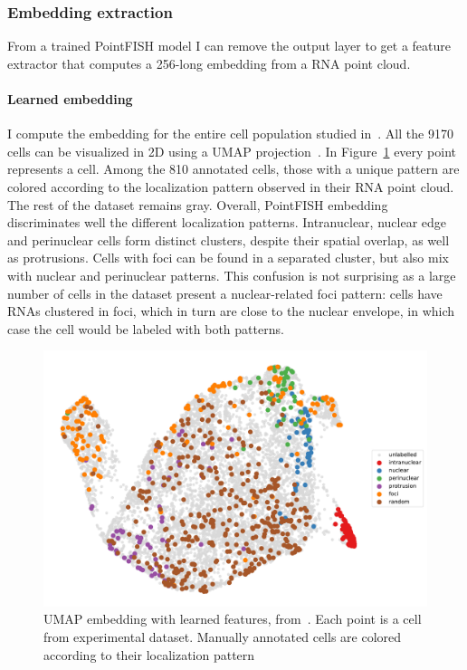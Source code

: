 \subsubsection{Embedding extraction}

From a trained PointFISH model I can remove the output layer to get a feature extractor that computes a 256-long embedding from a \ac{RNA} point cloud.

\paragraph{Learned embedding}

I compute the embedding for the entire cell population studied in~\cite{CHOUAIB_2020}.
All the 9170 cells can be visualized in 2D using a UMAP projection~\cite{McInnes2018}.
In Figure~\ref{fig:umap_real} every point represents a cell.
Among the 810 annotated cells, those with a unique pattern are colored according to the localization pattern observed in their \ac{RNA} point cloud.
The rest of the dataset remains gray.
Overall, PointFISH embedding discriminates well the different localization patterns.
Intranuclear, nuclear edge and perinuclear cells form distinct clusters, despite their spatial overlap, as well as protrusions.
Cells with foci can be found in a separated cluster, but also mix with nuclear and perinuclear patterns.
This confusion is not surprising as a large number of cells in the dataset present a nuclear-related foci pattern: cells have \ac{RNA}s clustered in foci, which in turn are close to the nuclear envelope, in which case the cell would be labeled with both patterns.

\begin{figure}[]
    \centering
    \includegraphics[width=\textwidth]{figures/chapter4/umap_real}
    \caption[UMAP embedding with exprimental dataset]{UMAP embedding with learned features, from~\cite{pointfish_2022}.
	Each point is a cell from experimental dataset.
	Manually annotated cells are colored according to their localization pattern}
    \label{fig:umap_real}
\end{figure}

